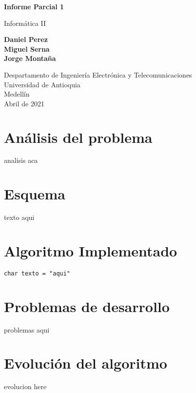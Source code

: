 \documentclass{article}
\begin{document}
\begin{titlepage}
    \begin{center}
        \vspace*{1cm}
            
        \Huge
        \textbf{Informe Parcial 1}
            
        \vspace{0.5cm}
        \LARGE
        Informática II
            
        \vspace{1.5cm}
            
        \textbf{Daniel Perez\\Miguel Serna\\Jorge Montaña}
            
        \vfill
            
        \vspace{0.8cm}
            
        \Large
        Despartamento de Ingeniería Electrónica y Telecomunicaciones\\
        Universidad de Antioquia\\
        Medellín\\
        Abril de 2021
            
    \end{center}
\end{titlepage}

\tableofcontents

\section{Análisis del problema}
analisis aca

\section{Esquema} \label{contenido}
texto aqui
\section{Algoritmo Implementado} \label{contenido}
\begin{lstlisting}
char texto = "aqui"
\end{lstlisting}

\section{Problemas de desarrollo} \label{conclulsion}
problemas aqui
\section{Evolución del algoritmo} \label{conclulsion}
evolucion here


\end{document}
